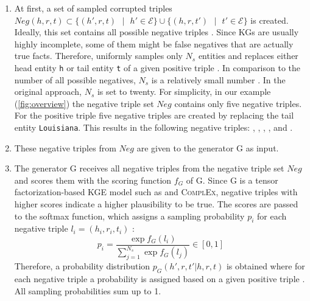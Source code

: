 \begin{enumerate}
    \item 
    At first, a set of sampled corrupted triples $Neg(h,r,t)\subset\{(h',r,t) \text{ } | \text{ } h' \in \mathcal{E}\} \cup \{(h,r,t') \text{ } | \text{ } t'\in\mathcal{E}\}$ is created.
    Ideally, this set contains all possible negative triples \cite{cai2017kbgan}.
    Since \acp{KG} are usually highly incomplete, some of them might be false negatives that are actually true facts.
    Therefore, \kbgan uniformly samples only $N_s$ entities and replaces either head entity \texttt{h} or tail entity \texttt{t} of a given positive triple .
    In comparison to the number of all possible negatives, $N_s$ is a relatively small number \cite{cai2017kbgan}.
    In the original approach, $N_s$ is set to twenty.
    For simplicity, in our example (\autoref{fig:overview}) the negative triple set   $Neg$ contains only five negative triples.
    For the positive triple  five negative triples
    are created by replacing the tail entity \texttt{Louisiana}.
    This results in the following negative triples:
    ,
    ,
    ,
    , and 
    .
    
    \item 
    These negative triples from $Neg$ are given to the generator G as input.
    
    \item 
    The generator G receives all negative triples from the negative triple set $Neg$ and scores them with the scoring function $f_G$ of G.
    Since G is a tensor factorization-based \ac{KGE} model such as \distmult and \textsc{ComplEx}, negative triples with higher scores indicate a higher plausibility to be true.
    The scores are passed to the softmax function, which assigns a sampling probability $p_i$ for each negative triple $l_i = (h_i, r_i, t_i)$ \cite{cai2017kbgan}:
    \begin{equation} \label{eq:origsampling}
        p_i = \frac{\exp{f_G(l_i)}}{\sum_{j=1}^{N_s}{\exp{f_G(l_j)}}} \in [0,1]
    \end{equation}
    Therefore, a probability distribution $p_G(h',r,t'|h,r,t)$ is obtained where for each negative triple  a probability is assigned based on a given positive triple . 
    All sampling probabilities sum up to 1.
    

\end{enumerate}
